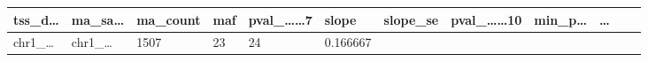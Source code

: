 \documentclass[
]{article}
\begin{document}
\begin{longtable}[]{@{}llllllllllll@{}}
\begin{minipage}[b]{0.06\columnwidth}
tss\_d\ldots{}\strut
\end{minipage} & \begin{minipage}[b]{0.06\columnwidth}\raggedright
ma\_sa\ldots{}\strut
\end{minipage} & \begin{minipage}[b]{0.06\columnwidth}\raggedright
ma\_count\strut
\end{minipage} & \begin{minipage}[b]{0.06\columnwidth}\raggedright
maf\strut
\end{minipage} & \begin{minipage}[b]{0.08\columnwidth}\raggedright
pval\_\ldots\ldots7\strut
\end{minipage} & \begin{minipage}[b]{0.06\columnwidth}\raggedright
slope\strut
\end{minipage} & \begin{minipage}[b]{0.06\columnwidth}\raggedright
slope\_se\strut
\end{minipage} & \begin{minipage}[b]{0.09\columnwidth}\raggedright
pval\_\ldots\ldots10\strut
\end{minipage} & \begin{minipage}[b]{0.06\columnwidth}\raggedright
min\_p\ldots{}\strut
\end{minipage} & \begin{minipage}[b]{0.02\columnwidth}\raggedright
\ldots{}\strut
\end{minipage}\tabularnewline
\midrule
\endhead
\begin{minipage}[t]{0.06\columnwidth}\raggedright
chr1\_\ldots{}\strut
\end{minipage} & \begin{minipage}[t]{0.06\columnwidth}\raggedright
chr1\_\ldots{}\strut
\end{minipage} & \begin{minipage}[t]{0.06\columnwidth}\raggedright
1507\strut
\end{minipage} & \begin{minipage}[t]{0.06\columnwidth}\raggedright
23\strut
\end{minipage} & \begin{minipage}[t]{0.06\columnwidth}\raggedright
24\strut
\end{minipage} & \begin{minipage}[t]{0.06\columnwidth}\raggedright
0.166667\strut
\end{minipage} & \begin{minipage}[t]{0.08\columnwidth}\raggedright

\end{minipage}
\end{longtable}
\end{document}
